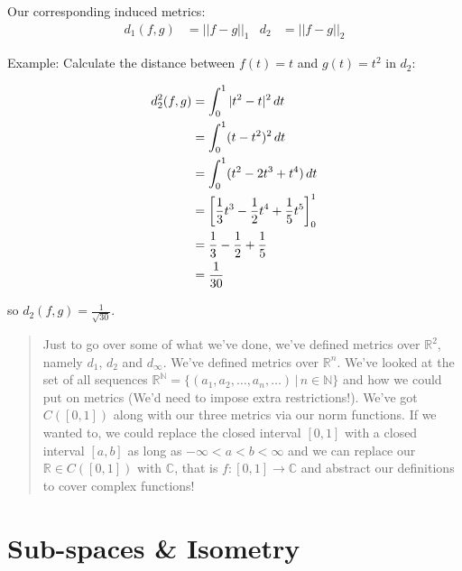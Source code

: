 \documentclass[10pt]{article}
\begin{document}
Our corresponding induced metrics:
\begin{align*}
    d_{1}(f,g)&=||f-g||_{1} & d_{2}&=||f-g||_{2}
\end{align*}

Example: Calculate the distance between $f(t)=t$ and $g(t)=t^{2}$ in $d_{2}$:

\begin{multicols}{2}
    \begin{align*}
    d_{2}^{2}(f,g)&=\int_{0}^{1}|t^{2}-t|^{2}\,dt\\
    &=\int_{0}^{1}(t-t^{2})^{2}\,dt\\
    &=\int^{1}_{0}(t^{2}-2t^{3}+t^{4})\,dt\\
    &=\bigg{[}\frac{1}{3}t^{3}-\frac{1}{2}t^{4}+\frac{1}{5}t^{5}\bigg{]}_{0}^{1}\\
    &=\frac{1}{3}-\frac{1}{2}+\frac{1}{5}\\
    &=\frac{1}{30}
\end{align*}

\end{multicols}
so $d_{2}(f,g)=\frac{1}{\sqrt{30}}$.

\begin{quote}
    Just to go over some of what we've done, we've defined metrics over $\mathbb{R}^{2}$, namely $d_{1}$, $d_{2}$ and $d_{\infty}$. We've defined metrics over $\mathbb{R}^{n}$. We've looked at the set of all sequences $\mathbb{R}^{\mathbb{N}}=\{(a_{1}, a_{2}, \dots, a_{n}, \dots)\,|\,n\in\mathbb{N}\}$ and how we could put on metrics (We'd need to impose extra restrictions!). We've got $C([0,1])$ along with our three metrics via our norm functions. If we wanted to, we could replace the closed interval $[0,1]$ with a closed interval $[a,b]$ as long as $-\infty<a<b<\infty$ and we can replace our $\mathbb{R}\in C([0,1])$ with $\mathbb{C}$, that is $f:[0,1]\to\mathbb{C}$ and abstract our definitions to cover complex functions!
\end{quote}

\newpage

\section{Sub-spaces \& Isometry}
\end{document}
